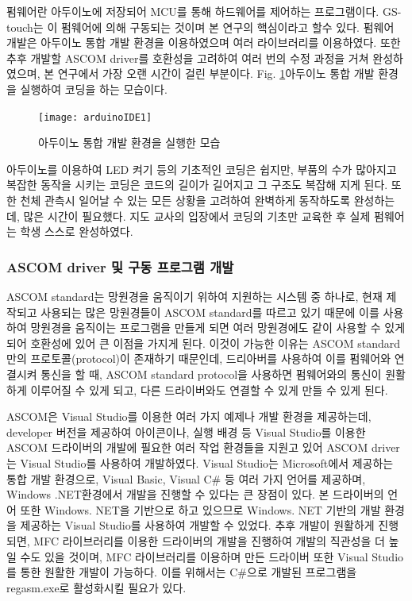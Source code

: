 펌웨어란 아두이노에 저장되어 MCU를 통해 하드웨어를 제어하는 프로그램이다. GS-touch는 이 펌웨어에 의해 구동되는 것이며 본 연구의 핵심이라고 할수 있다. 펌웨어 개발은 아두이노 통합 개발 환경을 이용하였으며 여러 라이브러리를 이용하였다. 또한 추후 개발할 ASCOM driver를 호환성을 고려하여 여러 번의 수정 과정을 거쳐 완성하였으며, 본 연구에서 가장 오랜 시간이 걸린 부분이다. Fig. \ref{fig:arduinoIDE1}\는 아두이노 통합 개발 환경을 실행하여 코딩을 하는 모습이다.

\begin{figure}[h]
	\begin{center}
		\texttt{[image: arduinoIDE1]}
		\caption{아두이노 통합 개발 환경을 실행한 모습}
		\label{fig:arduinoIDE1}
	\end{center}
\end{figure}

아두이노를 이용하여 LED 켜기 등의 기초적인 코딩은 쉽지만, 부품의 수가 많아지고 복잡한 동작을 시키는 코딩은 코드의 길이가 길어지고 그 구조도 복잡해 지게 된다. 또한 천체 관측시 일어날 수 있는 모든 상황을 고려하여 완벽하게 동작하도록 완성하는데, 많은 시간이 필요했다. 지도 교사의 입장에서 코딩의 기초만 교육한 후 실제 펌웨어는 학생 스스로 완성하였다. 


\subsubsection{ASCOM driver 및 구동 프로그램 개발}

ASCOM standard는 망원경을 움직이기 위하여 지원하는 시스템 중 하나로, 현재 제작되고 사용되는 많은 망원경들이 ASCOM standard를 따르고 있기 때문에 이를 사용하여 망원경을 움직이는 프로그램을 만들게 되면 여러 망원경에도 같이 사용할 수 있게 되어 호환성에 있어 큰 이점을 가지게 된다. 이것이 가능한 이유는 ASCOM standard 만의 프로토콜(protocol)이 존재하기 때문인데, 드리아버를 사용하여 이를 펌웨어와 연결시켜 통신을 할 때, ASCOM standard protocol을 사용하면 펌웨어와의 통신이 원활하게 이루어질 수 있게 되고, 다른 드라이버와도 연결할 수 있게 만들 수 있게 된다.

ASCOM은 Visual Studio를 이용한 여러 가지 예제나 개발 환경을 제공하는데, developer 버전을 제공하여 아이콘이나, 실행 배경 등 Visual Studio를 이용한 ASCOM 드라이버의 개발에 필요한 여러 작업 환경들을 지원고 있어 ASCOM driver는 Visual Studio를 사용하여 개발하였다. Visual Studio는 Microsoft에서 제공하는 통합 개발 환경으로, Visual Basic, Visual C\# 등 여러 가지 언어를 제공하며, Windows .NET환경에서 개발을 진행할 수 있다는 큰 장점이 있다. 본 드라이버의 언어 또한 Windows. NET을 기반으로 하고 있으므로 Windows. NET 기반의 개발 환경을 제공하는 Visual Studio를 사용하여 개발할 수 있었다. 추후 개발이 원활하게 진행되면, MFC 라이브러리를 이용한 드라이버의 개발을 진행하여 개발의 직관성을 더 높일 수도 있을 것이며, MFC 라이브러리를 이용하며 만든 드라이버 또한 Visual Studio를 통한 원활한 개발이 가능하다. 이를 위해서는 C\#으로 개발된 프로그램을 regasm.exe로 활성화시킬 필요가 있다.

